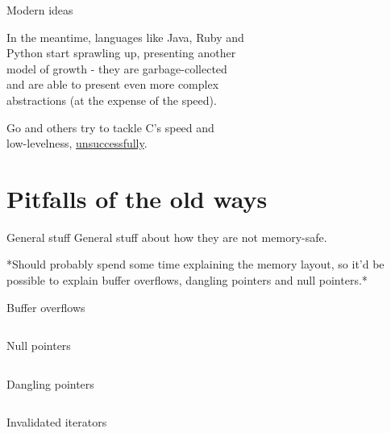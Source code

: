 \documentclass[usenames,dvipsnames,10pt,aspectratio=169]{beamer}
\begin{document}
\begin{frame}{Modern ideas}

\large
In the meantime, languages like Java, Ruby and\\
Python start sprawling up, presenting another\\
model of growth - they are garbage-collected\\
and are able to present even more complex\\
abstractions (at the expense of the speed).\\

\vspace{0.5cm}

Go and others try to tackle C's speed and\\
low-levelness, 
\href{https://cowlark.com/2009-11-15-go/}{unsuccessfully}.

\end{frame}


\section{Pitfalls of the old ways}

\begin{frame}{General stuff} 
	General stuff about how they are not memory-safe.
	

	*Should probably spend some time explaining the memory layout,
	so it'd be possible to explain buffer overflows, dangling 
	pointers and null pointers.*
\end{frame}

\begin{frame}{Buffer overflows} 
	\inputminted[fontsize=\large]{c}{code/overflow.c}
\end{frame}

\begin{frame}{Null pointers}
	\inputminted[fontsize=\large]{c}{code/nullp.c}
\end{frame}

\begin{frame}{Dangling pointers} 
	\inputminted[fontsize=\large]{c}{code/danp.c}
\end{frame}

\begin{frame}{Invalidated iterators} 
	\inputminted[fontsize=\large]{c}{code/iter.c}
\end{frame}
\end{document}
